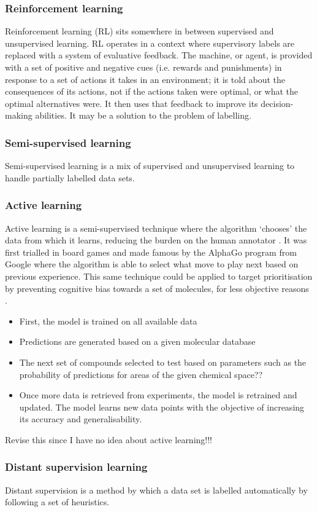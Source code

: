 \subsubsection{Reinforcement learning}
Reinforcement learning (RL) sits somewhere in between supervised and unsupervised learning. RL operates in a context where supervisory labels are replaced with a system of evaluative feedback. The machine, or agent, is provided with a set of positive and negative cues (i.e. rewards and punishments) in response to a set of actions it takes in an environment; it is told about the consequences of its actions, not if the actions taken were optimal, or what the optimal alternatives were. It then uses that feedback to improve its decision-making abilities. It may be a solution to the problem of labelling.

\subsubsection{Semi-supervised learning}
Semi-supervised learning is a mix of supervised and unsupervised learning to handle partially labelled data sets.

\subsubsection{Active learning}
Active learning is a semi-supervised technique where the algorithm ‘chooses’ the data from which it learns, reducing the burden on the human annotator \cite{brown2018}. It was first trialled in board games and made famous by the AlphaGo program from Google where the algorithm is able to select what move to play next based on previous experience. This same technique could be applied to target prioritisation by preventing cognitive bias towards a set of molecules, for less objective reasons \cite{brown2018}.
\begin{itemize}
    \item First, the model is trained on all available data
    \item Predictions are generated based on a given molecular database
    \item The next set of compounds selected to test based on parameters such as the probability of predictions for areas of the given chemical space??
    \item Once more data is retrieved from experiments, the model is retrained and updated. The model learns new data points with the objective of increasing its accuracy and generalisability.
\end{itemize}

Revise this since I have no idea about active learning!!!


\subsubsection{Distant supervision learning}
Distant supervision is a method by which a data set is labelled automatically by following a set of heuristics.

